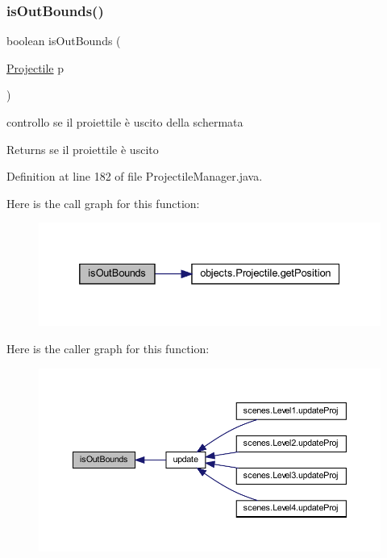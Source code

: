 \subsubsection{\texorpdfstring{is\+Out\+Bounds()}{isOutBounds()}}
{\footnotesize\ttfamily boolean is\+Out\+Bounds (\begin{DoxyParamCaption}\item[{\hyperlink{classobjects_1_1_projectile}{Projectile}}]{p }\end{DoxyParamCaption})}



controllo se il proiettile è uscito della schermata 

\begin{DoxyReturn}{Returns}
se il proiettile è uscito 
\end{DoxyReturn}


Definition at line 182 of file Projectile\+Manager.\+java.

Here is the call graph for this function\+:\nopagebreak
\begin{figure}[H]
\begin{center}
\leavevmode
\includegraphics[width=332pt]{classmanagers_1_1_projectile_manager_a57d53b4aface986fa08a24dab39b621d_cgraph}
\end{center}
\end{figure}
Here is the caller graph for this function\+:
\nopagebreak
\begin{figure}[H]
\begin{center}
\leavevmode
\includegraphics[width=350pt]{classmanagers_1_1_projectile_manager_a57d53b4aface986fa08a24dab39b621d_icgraph}
\end{center}
\end{figure}
\mbox{\label{classmanagers_1_1_projectile_manager_a90bf53002c3a067a25aba3e876974051}} 
